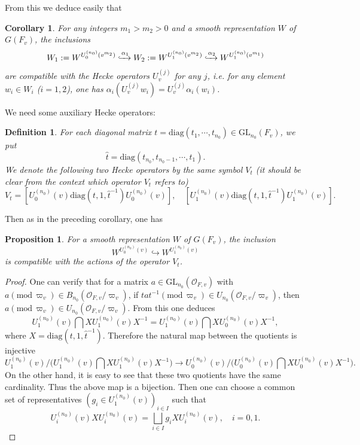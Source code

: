 \documentclass[12pt,oneside,reqno]{amsart}
\theoremstyle{plain}
\newtheorem{corollary}[theorem]{Corollary}
\newtheorem{definition}[theorem]{Definition}
\newtheorem{proposition}[theorem]{Proposition}
\begin{document}
	
	
	
	From this we deduce easily that
	\begin{corollary}
		For any integers $m_1>m_2>0$ and a smooth representation $W$ of
		$G(F_v)$, the inclusions
		\[
		W_1:=W^{U_0^{(n_0)}(v^{m_2})}
		\xhookrightarrow{\alpha_1}
		W_2:=W^{U_1^{(n_0)}(v^{m_2})}
		\xhookrightarrow{\alpha_2}
		W^{U_1^{(n_0)}(v^{m_1})}
		\]
		are compatible with the Hecke operators $U_v^{(j)}$ for any $j$, i.e. for any
		element $w_i\in W_i$ ($i=1,2$), one has $\alpha_i(U_v^{(j)}w_i)=U_v^{(j)}\alpha_i(w_i)$.
	\end{corollary}
	
	
	
	
	We need some auxiliary Hecke operators:
	\begin{definition}
		For each diagonal matrix
		$t=\mathrm{diag}(t_1,\cdots,t_{n_0})\in\mathrm{GL}_{n_0}(F_v)$, we put
		\[
		\hat{t}=
		\mathrm{diag}
		(t_{n_0},t_{n_0-1},\cdots,t_1).
		\]
		We denote the following two Hecke operators by the same symbol $V_t$
		(it should be clear from the context which operator $V_t$ refers to)
		\[
		V_t=
		[
		U_0^{(n_0)}(v)
		\mathrm{diag}
		(t,1,\hat{t}^{-1})
		U_0^{(n_0)}(v)
		],
		\quad
		[
		U_1^{(n_0)}(v)
		\mathrm{diag}
		(t,1,\hat{t}^{-1})
		U_1^{(n_0)}(v)
		].
		\]
	\end{definition}
	Then as in the preceding corollary,
	one has
	\begin{proposition}
		For a smooth representation $W$ of $G(F_v)$, the inclusion
		\[
		W^{U_0^{(n_0)}(v)}
		\hookrightarrow
		W^{U_1^{(n_0)}(v)}
		\]
		is compatible with the actions of the operator $V_t$.
	\end{proposition}
	\begin{proof}
		One can verify that for a matrix
		$a\in
		\mathrm{GL}_{n_0}(\mathcal{O}_{F,v})$
		with
		$a(\mathrm{mod}\,\varpi_v)
		\in
		B_{n_0}(\mathcal{O}_{F,v}/\varpi_v)$,
		if
		$tat^{-1}
		(\mathrm{mod}\,\varpi_v)
		\in
		U_{n_0}(\mathcal{O}_{F,v}/\varpi_v)$,
		then
		$a(\mathrm{mod}\,\varpi_v)
		\in
		U_{n_0}(\mathcal{O}_{F,v}/\varpi_v)$.
		From this one deduces
		\[
		U_1^{(n_0)}(v)
		\bigcap
		X
		U_1^{(n_0)}(v)
		X^{-1}
		=
		U_1^{(n_0)}(v)
		\bigcap
		X
		U_0^{(n_0)}(v)
		X^{-1},
		\]
		where $X=\mathrm{diag}(t,1,\hat{t}^{-1})$. Therefore the natural map between the quotients is injective
		\[
		U_1^{(n_0)}(v)/
		\big(
		U_1^{(n_0)}(v)\bigcap
		X
		U_1^{(n_0)}(v)
		X^{-1}
		\big)
		\rightarrow
		U_0^{(n_0)}(v)/
		\big(
		U_0^{(n_0)}(v)\bigcap
		X
		U_0^{(n_0)}(v)
		X^{-1}
		\big).
		\]
		On the other hand, it is easy to see that these two quotients have the same cardinality. Thus the above map is a bijection. Then one can choose a common set of representatives $(g_i\in U_1^{(n_0)}(v))_{i\in I}$ such that
		\[
		U_i^{(n_0)}(v)
		X
		U_i^{(n_0)}(v)
		=
		\bigsqcup_{i\in I}
		g_iXU_i^{(n_0)}(v),
		\quad
		i=0,1.
		\]
	\end{proof}
	
\end{document}
